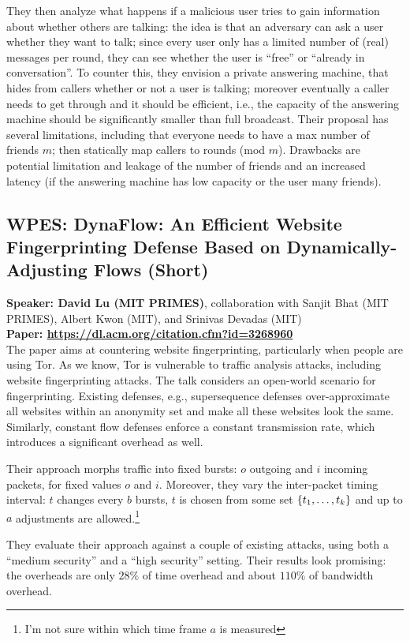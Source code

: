 \documentclass{article}
\begin{document}
They then analyze what happens if a malicious user tries to gain information about whether others are talking: the idea is that an adversary can ask a user whether they want to talk; since every user only has a limited number of (real) messages per round, they can see whether the user is ``free'' or ``already in conversation''. To counter this, they envision a private answering machine, that hides from callers whether or not a user is talking; moreover eventually a caller needs to get through and it should be efficient, i.e., the capacity of the answering machine should be significantly smaller than full broadcast. Their proposal has several limitations, including that everyone needs to have a max number of friends $m$; then statically map callers to rounds (mod $m$). Drawbacks are potential limitation and leakage of the number of friends and an increased latency (if the answering machine has low capacity or the user many friends).

\subsection{WPES: DynaFlow: An Efficient Website Fingerprinting Defense Based on Dynamically-Adjusting Flows (Short)}
\noindent\textbf{Speaker: David Lu (MIT PRIMES)}, collaboration with Sanjit Bhat (MIT PRIMES), Albert Kwon (MIT), and Srinivas Devadas (MIT)\\
\noindent\textbf{Paper: \url{https://dl.acm.org/citation.cfm?id=3268960}}\\

The paper aims at countering website fingerprinting, particularly when people are using Tor. As we know, Tor is vulnerable to traffic analysis attacks, including website fingerprinting attacks. The talk considers an open-world scenario for fingerprinting. Existing defenses, e.g., supersequence defenses over-approximate all websites within an anonymity set and make all these websites look the same. Similarly, constant flow defenses enforce a constant transmission rate, which introduces a significant overhead as well.

Their approach morphs traffic into fixed bursts: $o$ outgoing and $i$ incoming packets, for fixed values $o$ and $i$. Moreover, they vary the inter-packet timing interval: $t$ changes every $b$ bursts, $t$ is chosen from some set $\left\{ t_1, \ldots, t_k \right\}$ and up to $a$ adjustments are allowed.\footnote{I'm not sure within which time frame $a$ is measured}

They evaluate their approach against a couple of existing attacks, using both a ``medium security'' and a ``high security'' setting. Their results look promising: the overheads are only $28\%$ of time overhead and about $110\%$ of bandwidth overhead.
\end{document}
